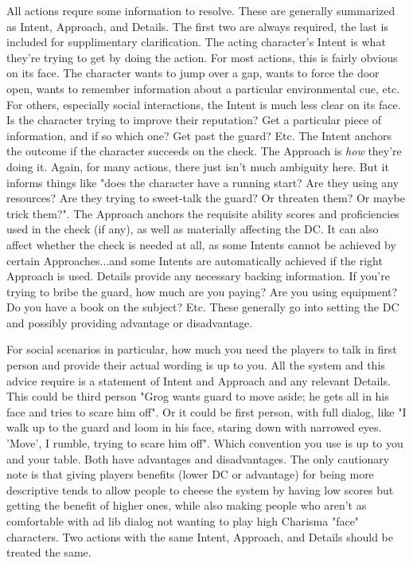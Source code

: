 \documentclass[10pt,twoside,openany,bg=none]{dndbook}
\begin{document}
All actions requre some information to resolve. These are generally summarized as Intent, Approach, and Details. The first two are always required, the last is included for supplimentary clarification. The acting character's Intent is what they're trying to get by doing the action. For most actions, this is fairly obvious on its face. The character wants to jump over a gap, wants to force the door open, wants to remember information about a particular environmental cue, etc. For others, especially social interactions, the Intent is much less clear on its face. Is the character trying to improve their reputation? Get a particular piece of information, and if so which one? Get past the guard? Etc. The Intent anchors the outcome if the character succeeds on the check. The Approach is \textit{how} they're doing it. Again, for many actions, there just isn't much ambiguity here. But it informs things like "does the character have a running start? Are they using any resources? Are they trying to sweet-talk the guard? Or threaten them? Or maybe trick them?". The Approach anchors the requisite ability scores and proficiencies used in the check (if any), as well as materially affecting the DC. It can also affect whether the check is needed at all, as some Intents cannot be achieved by certain Approaches...and some Intents are automatically achieved if the right Approach is used. Details provide any necessary backing information. If you're trying to bribe the guard, how much are you paying? Are you using equipment? Do you have a book on the subject? Etc. These generally go into setting the DC and possibly providing advantage or disadvantage.

For social scenarios in particular, how much you need the players to talk in first person and provide their actual wording is up to you. All the system and this advice require is a statement of Intent and Approach and any relevant Details. This could be third person "Grog wants guard to move aside; he gets all in his face and tries to scare him off". Or it could be first person, with full dialog, like "I walk up to the guard and loom in his face, staring down with narrowed eyes. 'Move', I rumble, trying to scare him off". Which convention you use is up to you and your table. Both have advantages and disadvantages. The only cautionary note is that giving players benefits (lower DC or advantage) for being more descriptive tends to allow people to cheese the system by having low scores but getting the benefit of higher ones, while also making people who aren't as comfortable with ad lib dialog not wanting to play high Charisma "face" characters. Two actions with the same Intent, Approach, and Details should be treated the same.
\end{document}

